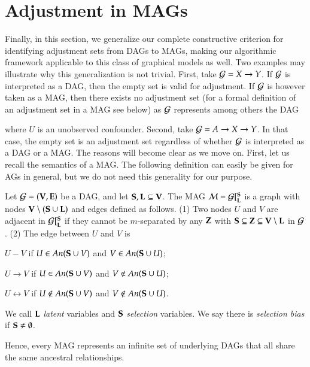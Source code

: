 \section{Adjustment in MAGs}

\label{sec:magadjust}

Finally, in this section, we generalize our complete constructive criterion for identifying 
adjustment sets from DAGs to MAGs, making our algorithmic framework applicable to this class of graphical models as well. 
%
Two examples may illustrate why this generalization is not
trivial. First, take ${\cal G}=X \to Y$. If ${\cal G}$ is interpreted as a DAG,
then the empty set is valid for adjustment. If ${\cal G}$ is however
taken as a MAG, then there exists no adjustment set (for a formal definition of 
an adjustment set in a MAG see below) as 
${\cal G}$ represents among others the 
DAG  where $U$ is an unobserved confounder.
Second, take ${\cal G}=A \to X \to Y$. In that case, the empty
set is an adjustment set regardless of whether ${\cal G}$
is interpreted as a DAG or a MAG. The reasons 
will become clear as we move on. First, let us recall
the semantics of a MAG. The following definition
can easily be given for AGs in general, but 
we do not need this generality for our purpose.
\begin{definition} 
Let ${\cal G}=({\bf V},{\bf E})$ be a DAG, 
and let ${\bf S},{\bf L} \subseteq {\bf V}$. The MAG ${\cal M}={\cal G}[^{\bf S}_{\bf L}$ is a graph
with nodes ${\bf V}\setminus({\bf S}\cup{\bf L})$ and edges 
defined as follows. (1) Two nodes $U$ and $V$ are adjacent in 
${\cal G}[^{\bf S}_{\bf L}$ if they cannot be $m$-separated by 
any ${\bf Z}$ with ${\bf S} \subseteq {\bf Z}
\subseteq {\bf V}\setminus{\bf L}$ in ${\cal G}$. (2) 
The edge between $U$ and $V$ is
\begin{description}
\item $U-V$ if $U \in \textit{An}({\bf S}\cup V)$ and $V \in \textit{An}({\bf S} \cup U)$;
 \item $U\to V$ if $U \in \textit{An}({\bf S}\cup V)$ and $V \notin \textit{An}({\bf S} \cup U)$;
  \item $U\leftrightarrow V$ if $U \notin \textit{An}({\bf S}\cup V)$ and $V \notin \textit{An}({\bf S} \cup U)$.
\end{description}
We call ${\bf L}$ \emph{latent} variables
and ${\bf S}$ \emph{selection} variables. We say
there is \emph{selection bias} if ${\bf S} \neq \emptyset$.
\label{def:mags}
\end{definition}
Hence, every MAG represents an infinite set of underlying
DAGs that all share the same ancestral relationships.
%
%
%
%
%
%
%
%

